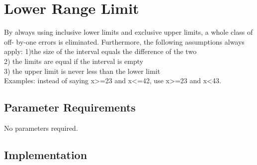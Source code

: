 %
%

\section{Lower Range Limit}
\label{LowerRangeLimit::overview}

By always using inclusive lower limits and exclusive upper
limits, a whole class of off-
by-one errors is eliminated. Furthermore, the following
assumptions always apply:
1)the size of the interval equals the
difference of the two  \\
2) the limits are equal if the interval is empty\\
3) the upper limit is never less than the lower limit\\

Examples: instead of saying x>=23 and x<=42, use x>=23 and
x<43.


\subsection{Parameter Requirements}

   No parameters required.

\subsection{Implementation}

